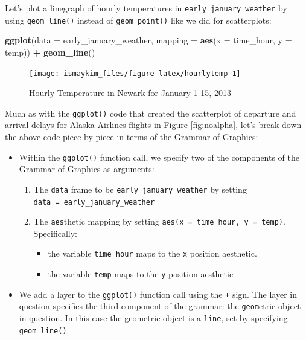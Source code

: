 \documentclass[12pt, krantz2,]{krantz}
\makeatletter
\newenvironment{Shaded}{\begin{snugshade}}{\end{snugshade}}
\newcommand{\DataTypeTok}[1]{\textcolor[rgb]{0.27,0.27,0.27}{#1}}
\newcommand{\KeywordTok}[1]{\textcolor[rgb]{0.27,0.27,0.27}{\textbf{#1}}}
\newcommand{\NormalTok}[1]{#1}
\newcommand{\OperatorTok}[1]{\textcolor[rgb]{0.43,0.43,0.43}{\textbf{#1}}}
\newcommand{\StringTok}[1]{\textcolor[rgb]{0.5,0.5,0.5}{#1}}
\providecommand{\tightlist}{%
  \setlength{\itemsep}{0pt}\setlength{\parskip}{0pt}}
\newenvironment{kframe}{%
\medskip{}
\setlength{\fboxsep}{.8em}
 \def\at@end@of@kframe{}%
 \ifinner\ifhmode%
  \def\at@end@of@kframe{\end{minipage}}%
  \begin{minipage}{\columnwidth}%
 \fi\fi%
 \def\FrameCommand##1{\hskip\@totalleftmargin \hskip-\fboxsep
 \colorbox{shadecolor}{##1}\hskip-\fboxsep
     \hskip-\linewidth \hskip-\@totalleftmargin \hskip\columnwidth}%
 \MakeFramed {\advance\hsize-\width
   \@totalleftmargin\z@ \linewidth\hsize
   \@setminipage}}%
 {\par\unskip\endMakeFramed%
 \at@end@of@kframe}
\renewenvironment{Shaded}{\begin{kframe}}{\end{kframe}}
\makeatother
\begin{document}
Let's plot a linegraph of hourly temperatures in \texttt{early\_january\_weather} by using \texttt{geom\_line()} instead of \texttt{geom\_point()} like we did for scatterplots:

\begin{Shaded}
\begin{Highlighting}[]
\KeywordTok{ggplot}\NormalTok{(}\DataTypeTok{data =}\NormalTok{ early_january_weather, }\DataTypeTok{mapping =} \KeywordTok{aes}\NormalTok{(}\DataTypeTok{x =}\NormalTok{ time_hour, }\DataTypeTok{y =}\NormalTok{ temp)) }\OperatorTok{+}
\StringTok{  }\KeywordTok{geom_line}\NormalTok{()}
\end{Highlighting}
\end{Shaded}

\begin{figure}

{\centering \texttt{[image: ismaykim\_files/figure-latex/hourlytemp-1]} 

}

\caption{Hourly Temperature in Newark for January 1-15, 2013}\label{fig:hourlytemp}
\end{figure}

Much as with the \texttt{ggplot()} code that created the scatterplot of departure and arrival delays for Alaska Airlines flights in Figure \ref{fig:noalpha}, let's break down the above code piece-by-piece in terms of the Grammar of Graphics:

\begin{itemize}
\tightlist
\item
  Within the \texttt{ggplot()} function call, we specify two of the components of the Grammar of Graphics as arguments:

  \begin{enumerate}
  \def\labelenumi{\arabic{enumi}.}
  \tightlist
  \item
    The \texttt{data} frame to be \texttt{early\_january\_weather} by setting \texttt{data\ =\ early\_january\_weather}
  \item
    The \texttt{aes}thetic mapping by setting \texttt{aes(x\ =\ time\_hour,\ y\ =\ temp)}. Specifically:

    \begin{itemize}
    \tightlist
    \item
      the variable \texttt{time\_hour} maps to the \texttt{x} position aesthetic.
    \item
      the variable \texttt{temp} maps to the \texttt{y} position aesthetic
    \end{itemize}
  \end{enumerate}
\item
  We add a layer to the \texttt{ggplot()} function call using the \texttt{+} sign. The layer in question specifies the third component of the grammar: the \texttt{geom}etric object in question. In this case the geometric object is a \texttt{line}, set by specifying \texttt{geom\_line()}.
\end{itemize}
\end{document}
